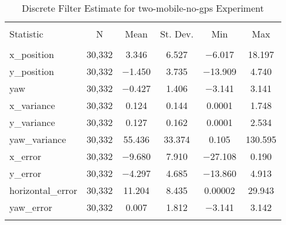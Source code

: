
\begin{table}[h] \centering 
  \caption{Discrete Filter Estimate for two-mobile-no-gps Experiment} 
  \label{tab:two_mobile_no_gps_discrete_summary} 
\begin{tabular}{@{\extracolsep{5pt}}lccccc} 
\\[-1.8ex]\hline 
\hline \\[-1.8ex] 
Statistic & \multicolumn{1}{c}{N} & \multicolumn{1}{c}{Mean} & \multicolumn{1}{c}{St. Dev.} & \multicolumn{1}{c}{Min} & \multicolumn{1}{c}{Max} \\ 
\hline \\[-1.8ex] 
x\_position & 30,332 & \num{3.346} & \num{6.527} & $-$6.017 & \num{18.197} \\ 
y\_position & 30,332 & $-$1.450 & \num{3.735} & $-$13.909 & \num{4.740} \\ 
yaw & 30,332 & $-$0.427 & \num{1.406} & $-$3.141 & \num{3.141} \\ 
x\_variance & 30,332 & \num{0.124} & \num{0.144} & \num{0.0001} & \num{1.748} \\ 
y\_variance & 30,332 & \num{0.127} & \num{0.162} & \num{0.0001} & \num{2.534} \\ 
yaw\_variance & 30,332 & \num{55.436} & \num{33.374} & \num{0.105} & \num{130.595} \\ 
x\_error & 30,332 & $-$9.680 & \num{7.910} & $-$27.108 & \num{0.190} \\ 
y\_error & 30,332 & $-$4.297 & \num{4.685} & $-$13.860 & \num{4.913} \\ 
horizontal\_error & 30,332 & \num{11.204} & \num{8.435} & \num{0.00002} & \num{29.943} \\ 
yaw\_error & 30,332 & \num{0.007} & \num{1.812} & $-$3.141 & \num{3.142} \\ 
\hline \\[-1.8ex] 
\end{tabular} 
\end{table} 
